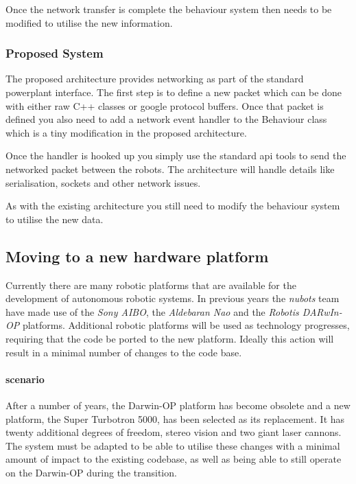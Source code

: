 \documentclass[english,12pt]{scrartcl}
\begin{document}
				Once the network transfer is complete the behaviour system then needs to be modified to utilise the new information.
			\subsubsection{Proposed System}
				The proposed architecture provides networking as part of the standard \gls{powerplant} interface.
				The first step is to define a new packet which can be done with either raw C++ classes or 
				google protocol buffers. Once that packet is defined you also need to add a network event handler
				to the Behaviour class which is a tiny modification in the proposed architecture.
				
				Once the handler is hooked up you simply use the standard api tools to send the networked packet
				between the robots. The architecture will handle details like serialisation, sockets and other network
				issues.
				
				As with the existing architecture you still need to modify the behaviour system to utilise the new data.

		\subsection{Moving to a new hardware platform}
			Currently there are many robotic platforms that are available for the development of autonomous
			robotic systems. In previous years the \emph{\gls{nubots}} team have made use of the \emph{Sony AIBO},
			the \emph{Aldebaran Nao} and the \emph{Robotis DARwIn-OP} platforms. Additional robotic platforms will be used as technology progresses, requiring that the code be ported to the new platform.
			Ideally this action will result in a minimal number of changes to the code base.

			\paragraph{scenario} After a number of years, the Darwin-OP platform has become obsolete and a new platform, the Super Turbotron 5000, has been selected as its replacement. It has twenty
			additional degrees of freedom, stereo vision and two giant laser cannons. The system must be
			adapted to be able to utilise these changes with a minimal amount of impact to the existing codebase, as well as being able to still operate on the Darwin-OP during the transition.
\end{document}
